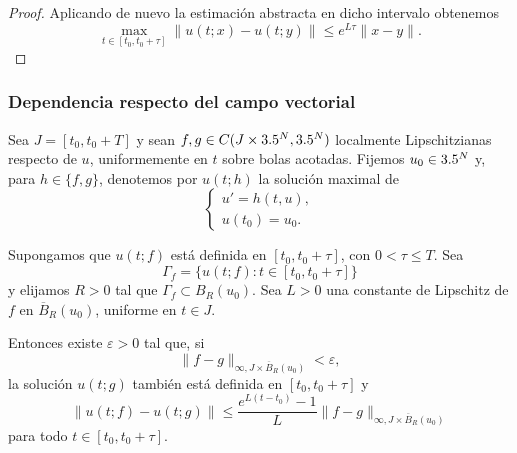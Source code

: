 \begin{proof}
    Aplicando de nuevo la estimación abstracta en dicho intervalo obtenemos
    \[
        \max_{t\in[t_0,t_0+\tau]}
        \|u(t;x)-u(t;y)\|
        \leq e^{L\tau}\|x-y\|.
    \]
\end{proof}

\subsubsection{Dependencia respecto del campo vectorial}

\begin{teorema}
    Sea $J=[t_0,t_0+T]$ y sean $f,g\in C(J\times3.5^N,3.5^N)$ localmente Lipschitzianas respecto de $u$, uniformemente en $t$ sobre bolas acotadas. Fijemos $u_0\in3.5^N$ y, para $h\in\{f,g\}$, denotemos por $u(t;h)$ la solución maximal de
    \[
        \begin{cases}
            u'=h(t,u),\\
            u(t_0)=u_0.
        \end{cases}
    \]

    Supongamos que $u(t;f)$ está definida en $[t_0,t_0+\tau]$, con $0<\tau\leq T$. Sea
    \[
        \Gamma_f=\{u(t;f):t\in[t_0,t_0+\tau]\}
    \]
    y elijamos $R>0$ tal que $\Gamma_f\subset B_R(u_0)$. Sea $L>0$ una constante de Lipschitz de $f$ en $\overline{B}_R(u_0)$, uniforme en $t\in J$.

    Entonces existe $\varepsilon>0$ tal que, si
    \[
        \|f-g\|_{\infty,J\times\overline{B}_R(u_0)}<\varepsilon,
    \]
    la solución $u(t;g)$ también está definida en $[t_0,t_0+\tau]$ y
    \[
        \|u(t;f)-u(t;g)\|
        \leq
        \frac{e^{L(t-t_0)}-1}{L}
        \|f-g\|_{\infty,J\times\overline{B}_R(u_0)}
    \]
    para todo $t\in[t_0,t_0+\tau]$.
\end{teorema}

